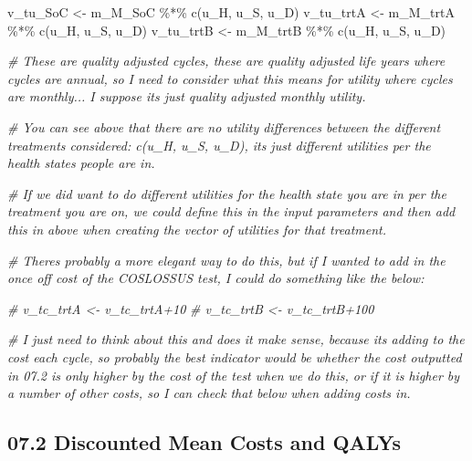 \documentclass[
]{article}
\newenvironment{Shaded}{\begin{snugshade}}{\end{snugshade}}
\newcommand{\CommentTok}[1]{\textcolor[rgb]{0.56,0.35,0.01}{\textit{#1}}}
\newcommand{\FunctionTok}[1]{\textcolor[rgb]{0.00,0.00,0.00}{#1}}
\newcommand{\NormalTok}[1]{#1}
\newcommand{\OtherTok}[1]{\textcolor[rgb]{0.56,0.35,0.01}{#1}}
\newcommand{\SpecialCharTok}[1]{\textcolor[rgb]{0.00,0.00,0.00}{#1}}
\begin{document}
\begin{Shaded}
\begin{Highlighting}[]
\NormalTok{v\_tu\_SoC  }\OtherTok{\textless{}{-}}\NormalTok{ m\_M\_SoC  }\SpecialCharTok{\%*\%} \FunctionTok{c}\NormalTok{(u\_H, u\_S, u\_D)  }
\NormalTok{v\_tu\_trtA }\OtherTok{\textless{}{-}}\NormalTok{ m\_M\_trtA }\SpecialCharTok{\%*\%} \FunctionTok{c}\NormalTok{(u\_H, u\_S, u\_D) }
\NormalTok{v\_tu\_trtB }\OtherTok{\textless{}{-}}\NormalTok{ m\_M\_trtB }\SpecialCharTok{\%*\%} \FunctionTok{c}\NormalTok{(u\_H, u\_S, u\_D) }

\CommentTok{\# These are quality adjusted cycles, these are quality adjusted life years where cycles are annual, so I need to consider what this means for utility where cycles are monthly... I suppose it\textquotesingle{}s just quality adjusted monthly utility.}

\CommentTok{\# You can see above that there are no utility differences between the different treatments considered: c(u\_H, u\_S, u\_D), it\textquotesingle{}s just different utilities per the health states people are in.}

\CommentTok{\# If we did want to do different utilities for the health state you are in per the treatment you are on, we could define this in the input parameters and then add this in above when creating the vector of utilities for that treatment.}
\end{Highlighting}
\end{Shaded}

\begin{Shaded}
\begin{Highlighting}[]
\CommentTok{\# There\textquotesingle{}s probably a more elegant way to do this, but if I wanted to add in the once off cost of the COSLOSSUS test, I could do something like the below:}

\CommentTok{\# v\_tc\_trtA \textless{}{-}  v\_tc\_trtA+10}
\CommentTok{\# v\_tc\_trtB \textless{}{-}  v\_tc\_trtB+100}

\CommentTok{\# I just need to think about this and does it make sense, because it\textquotesingle{}s adding to the cost each cycle, so probably the best indicator would be whether the cost outputted in 07.2 is only higher by the cost of the test when we do this, or if it is higher by a number of other costs, so I can check that below when adding costs in.}
\end{Highlighting}
\end{Shaded}

\hypertarget{discounted-mean-costs-and-qalys}{%
\subsection{07.2 Discounted Mean Costs and
QALYs}\label{discounted-mean-costs-and-qalys}}
\end{document}
